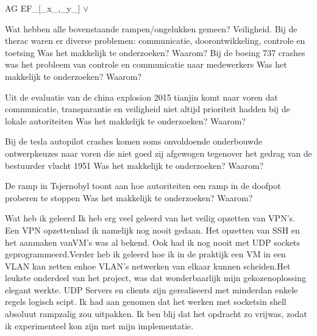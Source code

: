 AG EF_[_x_,_y_] $\vee$


Wat hebben alle bovenstaande rampen/ongelukken gemeen? Veiligheid.
Bij de therac waren er diverse problemen: communicatie, doorontwikkeling, controle en toetsing
Was het makkelijk te onderzoeken? Waarom?
Bij de boeing 737 crashes was het probleem van controle en communicatie naar medewerkers
Was het makkelijk te onderzoeken? Waarom?

Uit de evaluatie van de china explosion 2015 tianjin komt naar voren dat communicatie, transparantie en veiligheid niet altijd prioriteit hadden bij de lokale autoriteiten
Was het makkelijk te onderzoeken? Waarom?

Bij de tesla autopilot crashes komen soms onvoldoende onderbouwde ontwerpkeuzes naar voren die niet goed zij  afgewogen tegenover het gedrag van de bestuurder
vlucht 1951
Was het makkelijk te onderzoeken? Waarom?

De ramp in Tsjernobyl toont aan hoe autoriteiten een ramp in de doofpot proberen te stoppen
Was het makkelijk te onderzoeken? Waarom?



Wat heb ik geleerd
Ik heb erg veel geleerd van het veilig opzetten van VPN’s. Een VPN opzettenhad ik namelijk nog nooit gedaan. Het opzetten van SSH en het aanmaken vanVM’s was al bekend. Ook had ik nog nooit met UDP sockets geprogrammeerd.Verder heb ik geleerd hoe ik in de praktijk een VM in een VLAN kan zetten enhoe VLAN’s netwerken van elkaar kunnen scheiden.Het leukste onderdeel van het project, was dat wonderbaarlijk mijn gekozenoplossing elegant werkte. UDP Servers en clients zijn gerealiseerd met minderdan enkele regels logisch scipt. Ik had aan genomen dat het werken met socketsin shell absoluut rampzalig zou uitpakken. Ik ben blij dat het opdracht zo vrijwas, zodat ik experimenteel kon zijn met mijn implementatie.



